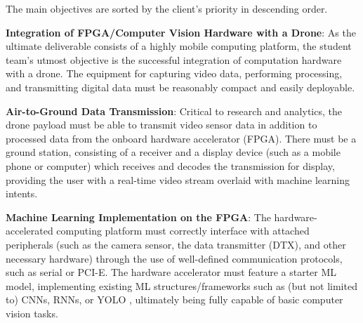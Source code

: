The main objectives are sorted by the client's priority in descending order.

\textbf{Integration of FPGA/Computer Vision Hardware with a Drone}:
As the ultimate deliverable consists of a highly mobile computing platform,
the student team's utmost objective is the successful integration of computation hardware with a drone.
The equipment for capturing video data, performing processing, and transmitting digital data must be reasonably compact and easily deployable.

\textbf{Air-to-Ground Data Transmission}:
Critical to research and analytics, the drone payload must be able to transmit video sensor data in addition to processed data
from the onboard hardware accelerator (FPGA). There must be a ground station, consisting of a receiver and a display device (such as a mobile phone or 
computer) which receives and decodes the transmission for display, providing the user with a real-time video stream overlaid with machine learning intents.


\textbf{Machine Learning Implementation on the FPGA}:
The hardware-accelerated computing platform must correctly interface with attached peripherals (such as the camera sensor, the data transmitter (DTX), and other necessary hardware) through the use of well-defined communication protocols, such as serial or PCI-E. The hardware accelerator must feature a starter ML model, implementing existing ML structures/frameworks such as (but not limited to) CNNs, RNNs, or YOLO \cite{yolo}, ultimately being fully capable of basic computer vision tasks.

